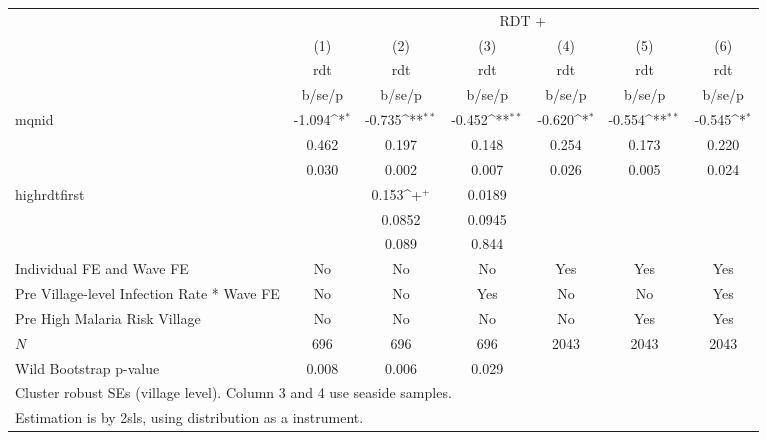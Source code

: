 {
\def\sym#1{\ifmmode^{#1}\else\(^{#1}\)\fi}
\begin{tabular}{l*{6}{c}}
\hline\hline
            &\multicolumn{6}{c}{RDT +}                                                                                                          \\
            &\multicolumn{1}{c}{(1)}&\multicolumn{1}{c}{(2)}&\multicolumn{1}{c}{(3)}&\multicolumn{1}{c}{(4)}&\multicolumn{1}{c}{(5)}&\multicolumn{1}{c}{(6)}\\
            &\multicolumn{1}{c}{rdt}&\multicolumn{1}{c}{rdt}&\multicolumn{1}{c}{rdt}&\multicolumn{1}{c}{rdt}&\multicolumn{1}{c}{rdt}&\multicolumn{1}{c}{rdt}\\
            &      b/se/p         &      b/se/p         &      b/se/p         &      b/se/p         &      b/se/p         &      b/se/p         \\
\hline
mqnid       &      -1.094\sym{*}  &      -0.735\sym{**} &      -0.452\sym{**} &      -0.620\sym{*}  &      -0.554\sym{**} &      -0.545\sym{*}  \\
            &       0.462         &       0.197         &       0.148         &       0.254         &       0.173         &       0.220         \\
            &       0.030         &       0.002         &       0.007         &       0.026         &       0.005         &       0.024         \\
highrdtfirst&                     &       0.153\sym{+}  &      0.0189         &                     &                     &                     \\
            &                     &      0.0852         &      0.0945         &                     &                     &                     \\
            &                     &       0.089         &       0.844         &                     &                     &                     \\
Individual FE and Wave FE &          No         &          No         &          No         &         Yes         &         Yes         &         Yes         \\
Pre Village-level Infection Rate * Wave FE&          No         &          No         &         Yes         &          No         &          No         &         Yes         \\
Pre High Malaria Risk Village &          No         &          No         &          No         &          No         &         Yes         &         Yes         \\
\hline
\(N\)       &         696         &         696         &         696         &        2043         &        2043         &        2043         \\
Wild Bootstrap p-value &       0.008         &       0.006         &       0.029         &                     &                     &                     \\
\hline\hline
\multicolumn{7}{l}{\footnotesize Cluster robust SEs (village level). Column 3 and 4 use seaside samples.}\\
\multicolumn{7}{l}{\footnotesize Estimation is by 2sls, using distribution as a instrument.}\\
\end{tabular}
}
